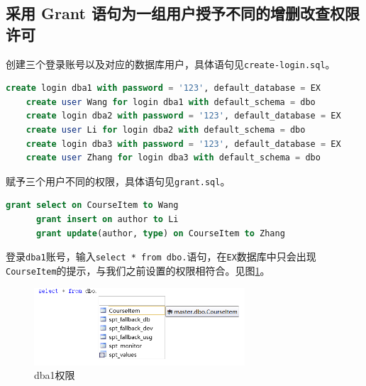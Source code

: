 \documentclass[11pt]{article}
\begin{document}
  \subsection{采用 Grant 语句为一组用户授予不同的增删改查权限许可}
  创建三个登录账号以及对应的数据库用户，具体语句见\verb|create-login.sql|。
  \begin{file}
    \begin{lstlisting}[language=sql]
    create login dba1 with password = '123', default_database = EX
    create user Wang for login dba1 with default_schema = dbo
    create login dba2 with password = '123', default_database = EX
    create user Li for login dba2 with default_schema = dbo
    create login dba3 with password = '123', default_database = EX
    create user Zhang for login dba3 with default_schema = dbo
    \end{lstlisting}
  \end{file}

  赋予三个用户不同的权限，具体语句见\verb|grant.sql|。
  \begin{file}
    \begin{lstlisting}[language=sql]
      grant select on CourseItem to Wang
      grant insert on author to Li
      grant update(author, type) on CourseItem to Zhang
    \end{lstlisting}
  \end{file}

  登录\verb|dba1|账号，输入\lstinline{select * from dbo.}语句，在\verb|EX|数据库中只会出现\verb|CourseItem|的提示，与我们之前设置的权限相符合。见图\ref{fig:dba1}。

  \begin{figure}[h]
    \centering
    \includegraphics[width=0.7\textwidth]{dba1.png}
    \caption{dba1权限}
    \label{fig:dba1}
  \end{figure}
\end{document}
